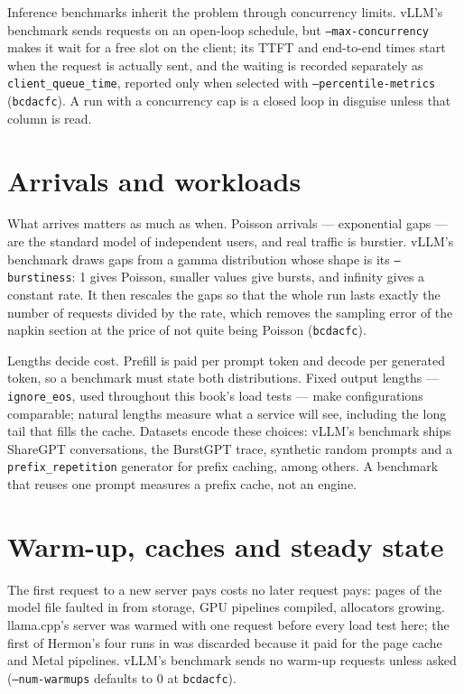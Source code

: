 Inference benchmarks inherit the problem through concurrency limits. vLLM's
benchmark sends requests on an open-loop schedule, but \texttt{--max-concurrency}
makes it wait for a free slot on the client; its TTFT and end-to-end times start
when the request is actually sent, and the waiting is recorded separately as
\texttt{client\_queue\_time}, reported only when selected with
\texttt{--percentile-metrics} (\texttt{bcdacfc}). A run with a concurrency cap is
a closed loop in disguise unless that column is read.

\section{Arrivals and workloads}

What arrives matters as much as when. Poisson arrivals --- exponential gaps ---
are the standard model of independent users, and real traffic is burstier.
vLLM's benchmark draws gaps from a gamma distribution whose shape is its
\texttt{--burstiness}: 1 gives Poisson, smaller values give bursts, and infinity
gives a constant rate. It then rescales the gaps so that the whole run lasts
exactly the number of requests divided by the rate, which removes the sampling
error of the napkin section at the price of not quite being Poisson
(\texttt{bcdacfc}).

Lengths decide cost. Prefill is paid per prompt token and decode per generated
token, so a benchmark must state both distributions. Fixed output lengths ---
\texttt{ignore\_eos}, used throughout this book's load tests --- make
configurations comparable; natural lengths measure what a service will see,
including the long tail that fills the cache. Datasets encode these choices:
vLLM's benchmark ships ShareGPT conversations, the BurstGPT trace, synthetic
random prompts and a \texttt{prefix\_repetition} generator for prefix caching,
among others. A benchmark that reuses one prompt measures a prefix cache, not an
engine.

\section{Warm-up, caches and steady state}

The first request to a new server pays costs no later request pays: pages of
the model file faulted in from storage, GPU pipelines compiled, allocators
growing. llama.cpp's server was warmed with one request before every load test
here; the first of Hermon's four runs in  was discarded
because it paid for the page cache and Metal pipelines. vLLM's benchmark sends no
warm-up requests unless asked (\texttt{--num-warmups} defaults to 0 at
\texttt{bcdacfc}).

